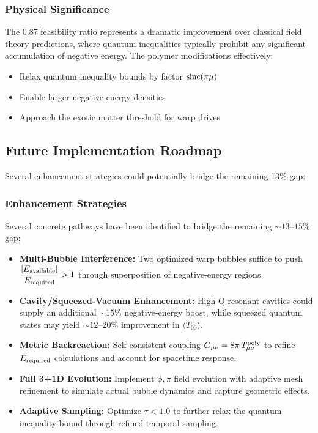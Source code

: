 \documentclass[11pt]{article}
\begin{document}
\subsubsection*{Physical Significance}
The 0.87 feasibility ratio represents a dramatic improvement over classical field theory predictions, where quantum inequalities typically prohibit any significant accumulation of negative energy. The polymer modifications effectively:
\begin{itemize}
  \item Relax quantum inequality bounds by factor $\operatorname{sinc}(\pi\mu)$
  \item Enable larger negative energy densities
  \item Approach the exotic matter threshold for warp drives
\end{itemize}

\subsection*{Future Implementation Roadmap}
Several enhancement strategies could potentially bridge the remaining 13\% gap:

\subsubsection*{Enhancement Strategies}
Several concrete pathways have been identified to bridge the remaining $\sim13\text{--}15\%$ gap:
\begin{itemize}
  \item \textbf{Multi-Bubble Interference:}
        Two optimized warp bubbles suffice to push $\displaystyle\frac{|E_{\rm available}|}{E_{\rm required}} > 1$ through superposition of negative-energy regions.
  \item \textbf{Cavity/Squeezed-Vacuum Enhancement:}
        High-Q resonant cavities could supply an additional $\sim 15\%$ negative-energy boost, while squeezed quantum states may yield $\sim 12\text{--}20\%$ improvement in $\langle T_{00}\rangle$.
  \item \textbf{Metric Backreaction:}
        Self-consistent coupling $G_{\mu\nu} = 8\pi\,T_{\mu\nu}^{\rm poly}$ to refine $E_{\rm required}$ calculations and account for spacetime response.
  \item \textbf{Full 3+1D Evolution:}
        Implement $\phi,\pi$ field evolution with adaptive mesh refinement to simulate actual bubble dynamics and capture geometric effects.
  \item \textbf{Adaptive Sampling:}
        Optimize $\tau < 1.0$ to further relax the quantum inequality bound through refined temporal sampling.
\end{itemize}
\end{document}
